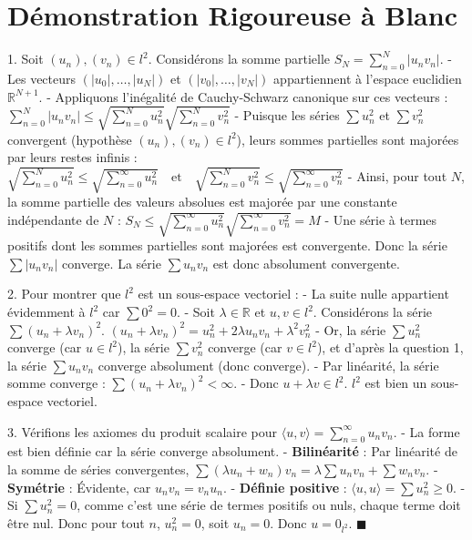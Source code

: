 \documentclass{report}
\begin{document}
\section*{Démonstration Rigoureuse à Blanc}

1. Soit $(u_n), (v_n) \in l^2$. Considérons la somme partielle $S_N = \sum_{n=0}^N |u_n v_n|$.
   - Les vecteurs $(|u_0|, \ldots, |u_N|)$ et $(|v_0|, \ldots, |v_N|)$ appartiennent à l'espace euclidien $\mathbb{R}^{N+1}$.
   - Appliquons l'inégalité de Cauchy-Schwarz canonique sur ces vecteurs :
     $ \sum_{n=0}^N |u_n v_n| \le \sqrt{\sum_{n=0}^N u_n^2} \sqrt{\sum_{n=0}^N v_n^2} $
   - Puisque les séries $\sum u_n^2$ et $\sum v_n^2$ convergent (hypothèse $(u_n), (v_n) \in l^2$), leurs sommes partielles sont majorées par leurs restes infinis :
     $ \sqrt{\sum_{n=0}^N u_n^2} \le \sqrt{\sum_{n=0}^\infty u_n^2} \quad \text{et} \quad \sqrt{\sum_{n=0}^N v_n^2} \le \sqrt{\sum_{n=0}^\infty v_n^2} $
   - Ainsi, pour tout $N$, la somme partielle des valeurs absolues est majorée par une constante indépendante de $N$ :
     $ S_N \le \sqrt{\sum_{n=0}^\infty u_n^2} \sqrt{\sum_{n=0}^\infty v_n^2} = M $
   - Une série à termes positifs dont les sommes partielles sont majorées est convergente. Donc la série $\sum |u_n v_n|$ converge. La série $\sum u_n v_n$ est donc absolument convergente.

2. Pour montrer que $l^2$ est un sous-espace vectoriel :
   - La suite nulle appartient évidemment à $l^2$ car $\sum 0^2 = 0$.
   - Soit $\lambda \in \mathbb{R}$ et $u, v \in l^2$. Considérons la série $\sum (u_n + \lambda v_n)^2$.
     $ (u_n + \lambda v_n)^2 = u_n^2 + 2\lambda u_n v_n + \lambda^2 v_n^2 $
   - Or, la série $\sum u_n^2$ converge (car $u \in l^2$), la série $\sum v_n^2$ converge (car $v \in l^2$), et d'après la question 1, la série $\sum u_n v_n$ converge absolument (donc converge).
   - Par linéarité, la série somme converge : $\sum (u_n + \lambda v_n)^2 < \infty$.
   - Donc $u + \lambda v \in l^2$. $l^2$ est bien un sous-espace vectoriel.

3. Vérifions les axiomes du produit scalaire pour $\langle u, v \rangle = \sum_{n=0}^\infty u_n v_n$.
   - La forme est bien définie car la série converge absolument.
   - \textbf{Bilinéarité} : Par linéarité de la somme de séries convergentes, $\sum (\lambda u_n + w_n)v_n = \lambda \sum u_n v_n + \sum w_n v_n$.
   - \textbf{Symétrie} : Évidente, car $u_n v_n = v_n u_n$.
   - \textbf{Définie positive} : $\langle u, u \rangle = \sum u_n^2 \ge 0$.
   - Si $\sum u_n^2 = 0$, comme c'est une série de termes positifs ou nuls, chaque terme doit être nul. Donc pour tout $n$, $u_n^2 = 0$, soit $u_n = 0$. Donc $u = 0_{l^2}$.
   $\blacksquare$
\end{document}
